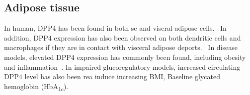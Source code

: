 \subsection{Adipose tissue}
In human, DPP4 has been found in both sc and viseral adipose cells.~\cite{Lamers2011} In addition, DPP4 expression has also been observed on both dendritic cells and macrophages if they are in contact with visceral adipose deports.~\cite{Zhong2013} In disease models, elevated DPP4 expression has commonly been found, including obesity and inflammation~\cite{Zhong2013}. In impaired glucoregulatory models, increased circulating DPP4 level has also been rea induce increasing BMI, Baseline glycated hemoglobin (HbA\textsubscript{1c}). 